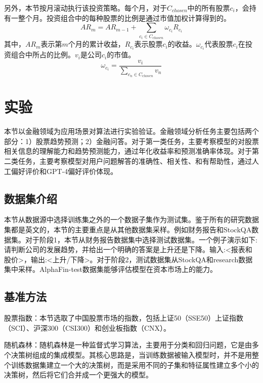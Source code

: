 另外，本节按月滚动执行该投资策略。每个月，对于$C_{chosen}$中的所有股票$c_i$，会持有一整个月。投资组合中的每种股票的比例是通过市值加权计算得到的。
\begin{equation}
	AR_m = AR_{m-1} + \sum_{c_i \in C_{chosen}}\omega_{c_i} R_{c_i}
\end{equation}
其中，$AR_m$表示第$m$个月的累计收益，$R_{c_i}$表示股票$c_i$的收益。$\omega_{c_i}$代表股票$c_i$在投资组合中所占的比例。$v_i$是公司$c_i$的市值。
\begin{equation}
	\omega_{c_i} = \frac{v_i}{\sum_{c_n \in C_{chosen}}v_n}
\end{equation}

\section{实验}

本节以金融领域为应用场景对算法进行实验验证。金融领域分析任务主要包括两个部分：1）股票趋势预测；2）金融问答。对于第一类任务，主要考察模型的对股票相关信息的理解能力和趋势预测能力，通过年化收益率和预测准确率体现。对于第二类任务，主要考察模型对用户问题解答的准确性、相关性、和有帮助性，通过人工偏好评价和GPT-4偏好评价体现。

\subsection{数据集介绍}

本节从数据源中选择训练集之外的一个数据子集作为测试集。鉴于所有的研究数据集都是英文的，本节的主要重点是从其他数据集采样。例如财务报告和StockQA数据集。对于阶段1，本节从财务报告数据集中选择测试数据集。一个例子演示如下:请判断公司的发展趋势，并给出一个明确的答案是上升还是下降。输入:<报表和股价>，输出:<上升/下降>。对于阶段2，测试数据集从StockQA和research数据集中采样。AlphaFin-test数据集能够评估模型在资本市场上的能力。

\subsection{基准方法}

股票指数：本节选取了中国股票市场的指数，包括上证50（SSE50）上证指数（SCI）、沪深300（CSI300）和创业板指数（CNX）。

随机森林：随机森林是一种监督式学习算法，主要用于分类和回归问题，它是由多个决策树组成的集成模型。其核心思路是，当训练数据被输入模型时，并不是用整个训练数据集建立一个大的决策树，而是采用不同的子集和特征属性建立多个小的决策树，然后将它们合并成一个更强大的模型。

